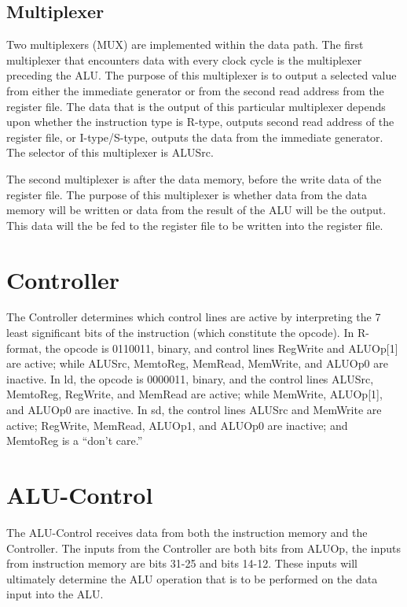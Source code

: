 \documentclass{article}
\begin{document}
\subsection{Multiplexer}
Two multiplexers (MUX) are implemented within the data path. The first multiplexer that encounters data with every clock cycle is the multiplexer preceding the ALU. The purpose of this multiplexer is to output a selected value from either the immediate generator or from the second read address from the register file. The data that is the output of this particular multiplexer depends upon whether the instruction type is R-type, outputs second read address of the register file, or I-type/S-type, outputs the data from the immediate generator. The selector of this multiplexer is ALUSrc.

The second multiplexer is after the data memory, before the write data of the register file. The purpose of this multiplexer is whether data from the data memory will be written or data from the result of the ALU will be the output. This data will the be fed to the register file to be written into the register file.


\section{Controller}
The Controller determines which control lines are active by interpreting the 7 least significant bits of the instruction  (which constitute the opcode). In R-format, the opcode is 0110011, binary, and control lines RegWrite and ALUOp[1] are active; while ALUSrc, MemtoReg, MemRead, MemWrite, and ALUOp0 are inactive. In ld, the opcode is 0000011, binary, and the control lines ALUSrc, MemtoReg, RegWrite, and MemRead are active; while MemWrite, ALUOp[1], and ALUOp0 are inactive. In sd, the control lines ALUSrc and MemWrite are active; RegWrite, MemRead, ALUOp1, and ALUOp0 are inactive; and MemtoReg is a ``don't care.''


\section{ALU-Control}
The ALU-Control receives data from both the instruction memory and the Controller. The inputs from the Controller are both bits from ALUOp, the inputs from instruction memory are bits 31-25 and bits 14-12. These inputs will ultimately determine the ALU operation that is to be performed on the data input into the ALU.
\end{document}
